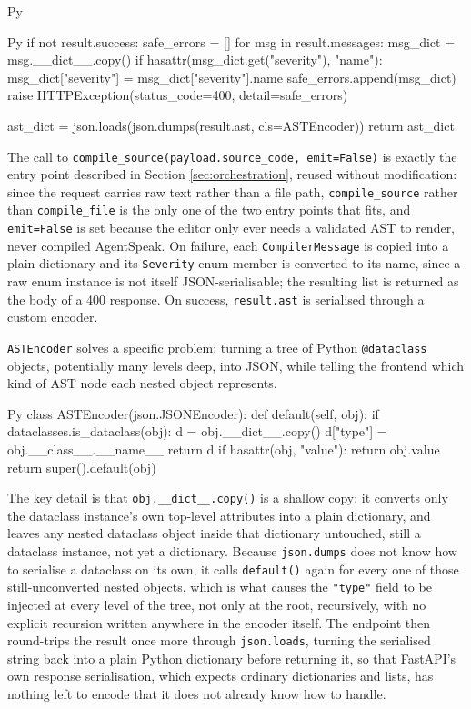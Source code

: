 \begin{codeblock}[]{Py}
\begin{codeblock}[]{Py}
    if not result.success:
        safe_errors = []
        for msg in result.messages:
            msg_dict = msg.__dict__.copy()
            if hasattr(msg_dict.get("severity"), "name"):
                msg_dict["severity"] = msg_dict["severity"].name
            safe_errors.append(msg_dict)
        raise HTTPException(status_code=400, detail=safe_errors)

    ast_dict = json.loads(json.dumps(result.ast, cls=ASTEncoder))
    return ast_dict
\end{codeblock}
The call to \lstinline|compile_source(payload.source_code, emit=False)| is exactly the entry point described in Section \ref{sec:orchestration}, reused without modification: since the request carries raw text rather than a file path, \lstinline|compile_source| rather than \lstinline|compile_file| is the only one of the two entry points that fits, and \lstinline|emit=False| is set because the editor only ever needs a validated AST to render, never compiled AgentSpeak. On failure, each \lstinline|CompilerMessage| is copied into a plain dictionary and its \lstinline|Severity| enum member is converted to its name, since a raw enum instance is not itself JSON-serialisable; the resulting list is returned as the body of a 400 response. On success, \lstinline|result.ast| is serialised through a custom encoder.

\lstinline|ASTEncoder| solves a specific problem: turning a tree of Python \lstinline|@dataclass| objects, potentially many levels deep, into JSON, while telling the frontend which kind of AST node each nested object represents.
\begin{codeblock}[]{Py}
class ASTEncoder(json.JSONEncoder):
    def default(self, obj):
        if dataclasses.is_dataclass(obj):
            d = obj.__dict__.copy()
            d["type"] = obj.__class__.__name__
            return d
        if hasattr(obj, "value"):
            return obj.value
        return super().default(obj)
\end{codeblock}
The key detail is that \lstinline|obj.__dict__.copy()| is a shallow copy: it converts only the dataclass instance's own top-level attributes into a plain dictionary, and leaves any nested dataclass object inside that dictionary untouched, still a dataclass instance, not yet a dictionary. Because \lstinline|json.dumps| does not know how to serialise a dataclass on its own, it calls \lstinline|default()| again for every one of those still-unconverted nested objects, which is what causes the \lstinline|"type"| field to be injected at every level of the tree, not only at the root, recursively, with no explicit recursion written anywhere in the encoder itself. The endpoint then round-trips the result once more through \lstinline|json.loads|, turning the serialised string back into a plain Python dictionary before returning it, so that FastAPI's own response serialisation, which expects ordinary dictionaries and lists, has nothing left to encode that it does not already know how to handle.


\end{codeblock}
